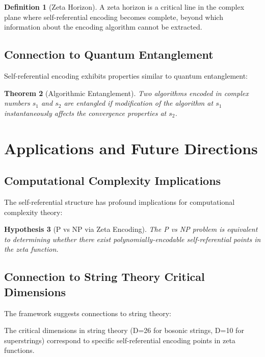 \documentclass[12pt]{article}
\theoremstyle{plain}
\newtheorem{theorem}{Theorem}[section]
\newtheorem{hypothesis}[theorem]{Hypothesis}
\theoremstyle{definition}
\newtheorem{definition}[theorem]{Definition}
\begin{document}
\begin{definition}[Zeta Horizon]
A zeta horizon is a critical line in the complex plane where self-referential encoding becomes complete, beyond which information about the encoding algorithm cannot be extracted.
\end{definition}

\subsection{Connection to Quantum Entanglement}

Self-referential encoding exhibits properties similar to quantum entanglement:

\begin{theorem}[Algorithmic Entanglement]
Two algorithms encoded in complex numbers $s_1$ and $s_2$ are entangled if modification of the algorithm at $s_1$ instantaneously affects the convergence properties at $s_2$.
\end{theorem}

\section{Applications and Future Directions}

\subsection{Computational Complexity Implications}

The self-referential structure has profound implications for computational complexity theory:

\begin{hypothesis}[P vs NP via Zeta Encoding]
The P vs NP problem is equivalent to determining whether there exist polynomially-encodable self-referential points in the zeta function.
\end{hypothesis}

\subsection{Connection to String Theory Critical Dimensions}

The framework suggests connections to string theory:

\begin{conjecture}
The critical dimensions in string theory (D=26 for bosonic strings, D=10 for superstrings) correspond to specific self-referential encoding points in zeta functions.
\end{conjecture}
\end{document}
